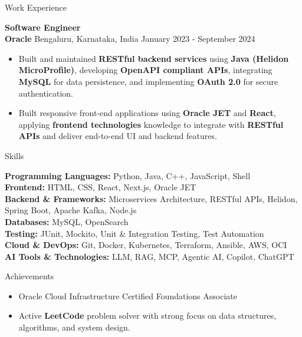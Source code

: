 \documentclass{resume}
\begin{document}
\begin{rSection}{Work Experience}
\vspace{6pt}

\textbf{Software Engineer} \\
\textbf{Oracle} \textbar{} Bengaluru, Karnataka, India \hspace*{\fill} January 2023 - September 2024
\vspace{-2pt}
\begin{itemize}
    \item Built and maintained \textbf{RESTful backend services} using \textbf{Java (Helidon MicroProfile)}, developing \textbf{OpenAPI compliant APIs}, integrating \textbf{MySQL} for data persistence, and implementing \textbf{OAuth 2.0} for secure authentication.
    \item Built responsive front-end applications using \textbf{Oracle JET} and \textbf{React}, applying \textbf{frontend technologies} knowledge to integrate with \textbf{RESTful APIs} and deliver end-to-end UI and backend features.
\end{itemize}

\end{rSection}

\begin{rSection}{Skills}

\vspace{-2pt}
\textbf{Programming Languages:} Python, Java, C++, JavaScript, Shell \\
\textbf{Frontend:} HTML, CSS, React, Next.js, Oracle JET \\
\textbf{Backend \& Frameworks:} Microservices Architecture, RESTful APIs, Helidon, Spring Boot, Apache Kafka, Node.js \\
\textbf{Databases:} MySQL, OpenSearch \\
\textbf{Testing:} JUnit, Mockito, Unit \& Integration Testing, Test Automation \\
\textbf{Cloud \& DevOps:} Git, Docker, Kubernetes, Terraform, Ansible, AWS, OCI \\
\textbf{AI Tools \& Technologies:} LLM, RAG, MCP, Agentic AI, Copilot, ChatGPT

\end{rSection}

\begin{rSection}{Achievements}

\begin{itemize}
    \item Oracle Cloud Infrastructure Certified Foundations Associate
    \item Active \textbf{LeetCode} problem solver with strong focus on data structures, algorithms, and system design.
\end{itemize}

\end{rSection}
\end{document}
